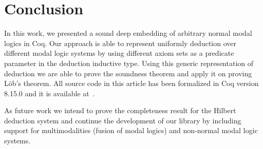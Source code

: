 \documentclass[sigconf]{acmart}
\begin{document}

\section{Conclusion}\label{sec:conclusion}

In this work, we presented a sound deep embedding of arbitrary
normal modal logics in Coq. Our approach is able to represent uniformly
deduction over different modal logic systems by using different axiom sets
as a predicate parameter in the deduction inductive type. Using this generic
representation of deduction we are able to prove the soundness theorem and
apply it on proving L\"ob's theorem. All source code in this article has
been formalized in Coq version 8.15.0 and it is available at~\cite{modal-coq-lib}.


As future work we intend to prove the completeness result for the Hilbert
deduction system and continue the development of our library by including
support for multimodalities (fusion of modal logics) and non-normal modal
logic systems.



\end{document}
